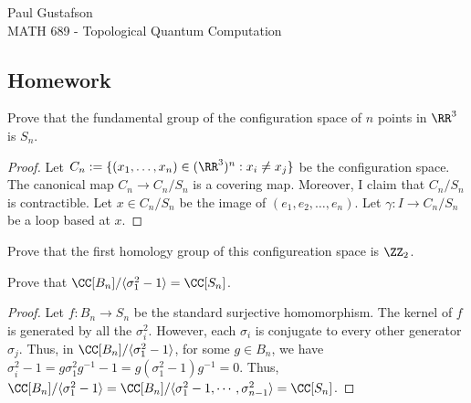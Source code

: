 \documentclass{article}
\begin{document}
\noindent Paul Gustafson\\
\noindent MATH 689 - Topological Quantum Computation

\subsection*{Homework}
 Prove that the fundamental group of the configuration space of $n$ points  in $\RR^3$  is $S_n$.
\begin{proof}
  Let $C_n := \{ (x_1, \ldots, x_n) \in (\RR^3)^n : x_i \neq x_j\}$ be the configuration space.
  The canonical map $C_n \to C_n/S_n$ is a covering map.  Moreover, I claim that $C_n/S_n$ is contractible.
  Let $x \in C_n/S_n$ be the image of $(e_1, e_2, \ldots, e_n)$.  Let $\gamma: I \to C_n/S_n$ be a loop based
  at $x$.
\end{proof}

 Prove that the first homology group of this configureation space is $\ZZ_2$.

 Prove that $\CC[B_n] / \langle \sigma_1^2 - 1 \rangle = \CC[S_n]$.
\begin{proof}
  Let  $f: B_n \to S_n$ be the standard surjective homomorphism.
  The kernel of $f$ is generated by all the $\sigma_i^2$.  However,
  each $\sigma_i$ is conjugate to every other generator $\sigma_j$.
 Thus, in $\CC[B_n] / \langle \sigma_1^2 - 1 \rangle$,
  for some $g \in B_n$, we have $\sigma_i^2 -1  = g\sigma_1^2g^{-1} -1  =g (\sigma_1^2 - 1) g^{-1} = 0$.
  Thus, $\CC[B_n] / \langle \sigma_1^2 - 1 \rangle = \CC[B_n] / \langle \sigma_1^2 - 1, \cdots, \sigma_{n-1}^2  \rangle = \CC[S_n]$. %
\end{proof}
\end{document}
